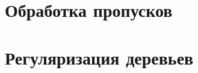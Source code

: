 \documentclass{beamer}
\begin{document}
	\section{Обработка пропусков}

	\begin{frame}

	\end{frame}

	\section{Регуляризация деревьев}

	\begin{frame}
		
	\end{frame}
\end{document}
